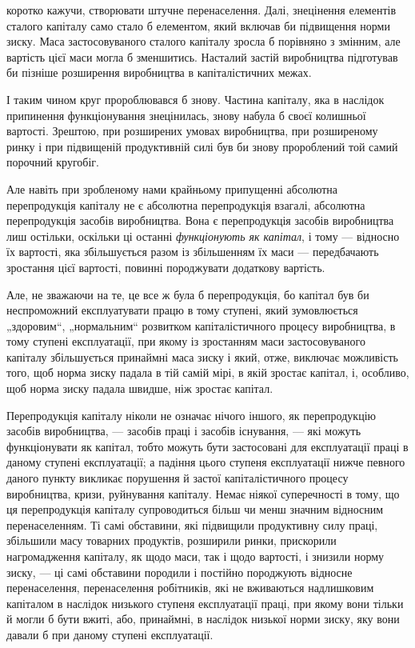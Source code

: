 \parcont{}  %
коротко кажучи, створювати штучне перенаселення. Далі, знецінення
елементів сталого капіталу само стало б елементом,
який включав би підвищення норми зиску. Маса застосовуваного
сталого капіталу зросла б порівняно з змінним, але вартість
цієї маси могла б зменшитись. Насталий застій виробництва
підготував би пізніше розширення виробництва в капіталістичних
межах.

І таким чином круг пророблювався б знову. Частина капіталу,
яка в наслідок припинення функціонування знецінилась,
знову набула б своєї колишньої вартості. Зрештою, при розширених
умовах виробництва, при розширеному ринку і при підвищеній
продуктивній силі був би знову пророблений той самий
порочний кругобіг.

Але навіть при зробленому нами крайньому припущенні абсолютна
перепродукція капіталу не є абсолютна перепродукція
взагалі, абсолютна перепродукція засобів виробництва. Вона
є перепродукція засобів виробництва лиш остільки, оскільки ці
останні \emph{функціонують як капітал}, і тому — відносно їх вартості,
яка збільшується разом із збільшенням їх маси — передбачають
зростання цієї вартості, повинні породжувати додаткову
вартість.

Але, не зважаючи на те, це все ж була б перепродукція,
бо капітал був би неспроможний експлуатувати працю в тому
ступені, який зумовлюється „здоровим“, „нормальним“ розвитком
капіталістичного процесу виробництва, в тому ступені експлуатації,
при якому із зростанням маси застосовуваного капіталу
збільшується принаймні маса зиску і який, отже, виключає
можливість того, щоб норма зиску падала в тій самій мірі,
в якій зростає капітал, і, особливо, щоб норма зиску падала
швидше, ніж зростає капітал.

Перепродукція капіталу ніколи не означає нічого іншого, як
перепродукцію засобів виробництва, — засобів праці і засобів
існування, — які можуть функціонувати як капітал, тобто можуть
бути застосовані для експлуатації праці в даному ступені експлуатації;
а падіння цього ступеня експлуатації нижче певного
даного пункту викликає порушення й застої капіталістичного процесу
виробництва, кризи, руйнування капіталу. Немає ніякої суперечності
в тому, що ця перепродукція капіталу супроводиться
більш чи менш значним відносним перенаселенням. Ті самі обставини,
які підвищили продуктивну силу праці, збільшили масу
товарних продуктів, розширили ринки, прискорили нагромадження
капіталу, як щодо маси, так і щодо вартості, і знизили норму
зиску, — ці самі обставини породили і постійно породжують відносне
перенаселення, перенаселення робітників, які не вживаються
надлишковим капіталом в наслідок низького ступеня експлуатації
праці, при якому вони тільки й могли б бути вжиті, або, принаймні,
в наслідок низької норми зиску, яку вони давали б при даному
ступені експлуатації.
